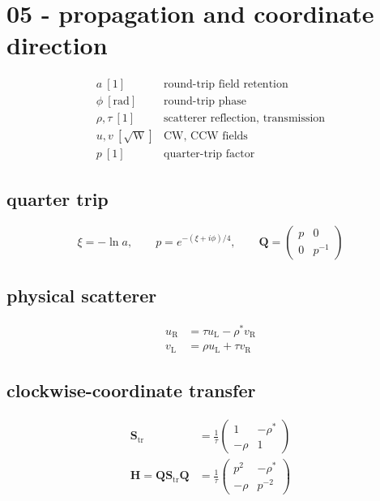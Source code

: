 \section*{05 - propagation and coordinate direction}

\[
\begin{array}{ll}a\ [1]&\text{round-trip field retention}\\[0.6em]\phi\ [\mathrm{rad}]&\text{round-trip phase}\\[0.6em]\rho,\tau\ [1]&\text{scatterer reflection, transmission}\\[0.6em]u,v\ [\sqrt{\mathrm W}]&\text{CW, CCW fields}\\[0.6em]p\ [1]&\text{quarter-trip factor}\end{array}
\]

\subsection*{quarter trip}
\[
\displaystyle \xi=-\ln a,\qquad p=e^{-(\xi+i\phi)/4},\qquad\mathbf Q=\begin{pmatrix}p&0\\0&p^{-1}\end{pmatrix}
\]

\subsection*{physical scatterer}
\[
\displaystyle \begin{aligned}u_{\mathrm R}&=\tau u_{\mathrm L}-\rho^*v_{\mathrm R}\\v_{\mathrm L}&=\rho u_{\mathrm L}+\tau v_{\mathrm R}\end{aligned}
\]

\subsection*{clockwise-coordinate transfer}
\[
\displaystyle \begin{aligned}\mathbf S_{\mathrm{tr}}&=\frac1\tau\begin{pmatrix}1&-\rho^*\\-\rho&1\end{pmatrix}\\\mathbf H=\mathbf Q\mathbf S_{\mathrm{tr}}\mathbf Q&=\frac1\tau\begin{pmatrix}p^2&-\rho^*\\-\rho&p^{-2}\end{pmatrix}\end{aligned}
\]
